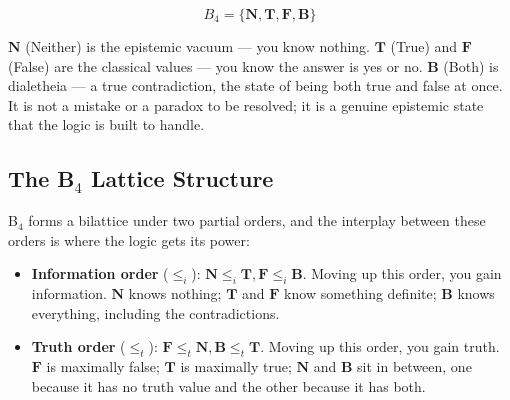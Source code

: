 \documentclass[11pt,a4paper,twocolumn]{article}
\begin{document}
\begin{equation}
B_4 = \{\mathbf{N}, \mathbf{T}, \mathbf{F}, \mathbf{B}\}
\end{equation}

$\mathbf{N}$ (Neither) is the epistemic vacuum — you know nothing. $\mathbf{T}$ (True) and $\mathbf{F}$ (False) are the classical values — you know the answer is yes or no. $\mathbf{B}$ (Both) is dialetheia — a true contradiction, the state of being both true and false at once. It is not a mistake or a paradox to be resolved; it is a genuine epistemic state that the logic is built to handle.

\subsection{The B$_4$ Lattice Structure}

B$_4$ forms a bilattice under two partial orders, and the interplay between these orders is where the logic gets its power:

\begin{itemize}
\item \textbf{Information order} ($\leq_i$): $\mathbf{N} \leq_i \mathbf{T}, \mathbf{F} \leq_i \mathbf{B}$. Moving up this order, you gain information. $\mathbf{N}$ knows nothing; $\mathbf{T}$ and $\mathbf{F}$ know something definite; $\mathbf{B}$ knows everything, including the contradictions.

\item \textbf{Truth order} ($\leq_t$): $\mathbf{F} \leq_t \mathbf{N}, \mathbf{B} \leq_t \mathbf{T}$. Moving up this order, you gain truth. $\mathbf{F}$ is maximally false; $\mathbf{T}$ is maximally true; $\mathbf{N}$ and $\mathbf{B}$ sit in between, one because it has no truth value and the other because it has both.
\end{itemize}
\end{document}
